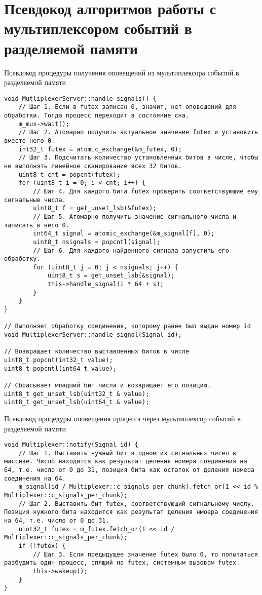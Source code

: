 \chapter{Псевдокод алгоритмов работы с мультиплексором событий в разделяемой памяти}\label{sec:app:1}

\begin{algorithm}[!h]
\caption{Псевдокод процедуры получения оповещений из мультиплексора событий в разделяемой памяти}
\label{appendix91:ReceiverCode}
\begin{lstlisting}[frame=tlrb]
void MutliplexerServer::handle_signals() {
	// Шаг 1. Если в futex записан 0, значит, нет оповещений для обработки. Тогда процесс переходит в состояние сна.
	m_mux->wait();
	// Шаг 2. Атомарно получить актуальное значение futex и установить вместо него 0.
	int32_t futex = atomic_exchange(&m_futex, 0);
	// Шаг 3. Подсчитать количество установленных битов в числе, чтобы не выполнять линейное сканирование всех 32 битов.
	uint8_t cnt = popcnt(futex);
	for (uint8_t i = 0; i < cnt; i++) {
		// Шаг 4. Для каждого бита futex проверить соответствующие ему сигнальные числа.
		uint8_t f = get_unset_lsb(&futex);
		// Шаг 5. Атомарно получить значение сигнального числа и записать в него 0.
		int64_t signal = atomic_exchange(&m_signal[f], 0);
		uint8_t nsignals = popcntl(signal);
		// Шаг 6. Для каждого найденного сигнала запустить его обработку.
		for (uint8_t j = 0; j < nsignals; j++) {
			uint8_t s = get_unset_lsb(&signal);
			this->handle_signal(i * 64 + s);
		}
	}
}

// Выполняет обработку соединения, которому ранее был выдан номер id
void MultiplexerServer::handle_signal(Signal id);

// Возвращает количество выставленных битов в числе
uint8_t popcnt(int32_t value);
uint8_t popcntl(int64_t value);

// Сбрасывает младший бит числа и возвращает его позицию.
uint8_t get_unset_lsb(uint32_t & value);
uint8_t get_unset_lsb(uint64_t & value);
\end{lstlisting}
\end{algorithm}

\begin{algorithm}[!h]
\caption{Псевдокод процедуры оповещения процесса через мультиплексор событий в разделяемой памяти}
\label{appendix91:SignalCode}
\begin{lstlisting}[frame=tlrb]
void Multiplexer::notify(Signal id) {
	// Шаг 1. Выставить нужный бит в одном из сигнальных чисел в массиве. Число находится как результат деления номера соединения на 64, т.е. число от 0 до 31, позиция бита как остаток от деления номера соединения на 64.
	m_signal[id / Multiplexer::c_signals_per_chunk].fetch_or(1 << id % Multiplexer::c_signals_per_chunk);
    // Шаг 2. Выставить бит futex, соответствующий сигнальному числу. Позиция нужного бита находится как результат деления нмоера соединения на 64, т.е. число от 0 до 31.
	uint32_t futex = m_futex.fetch_or(1 << id / Multiplexer::c_signals_per_chunk);
	if (!futex) {
		// Шаг 3. Если предыдущее значение futex было 0, то попытаться разбудить один процесс, спящий на futex, системным вызовом futex.
		this->wakeup();
	}
}
\end{lstlisting}
\end{algorithm}

